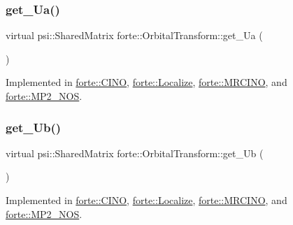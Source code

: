 \mbox{\label{classforte_1_1_orbital_transform_aedd124480b35eba56653109578c05ec9}} 
\subsubsection{\texorpdfstring{get\+\_\+\+Ua()}{get\_Ua()}}
{\footnotesize\ttfamily virtual psi\+::\+Shared\+Matrix forte\+::\+Orbital\+Transform\+::get\+\_\+\+Ua (\begin{DoxyParamCaption}{ }\end{DoxyParamCaption})\hspace{0.3cm}{\ttfamily [pure virtual]}}



Implemented in \mbox{\hyperlink{classforte_1_1_c_i_n_o_a382fe0963a51a908790fda6a7aab0e7c}{forte\+::\+C\+I\+NO}}, \mbox{\hyperlink{classforte_1_1_localize_a9ee389a31b8856a670ff4854906979af}{forte\+::\+Localize}}, \mbox{\hyperlink{classforte_1_1_m_r_c_i_n_o_a75ca07096273157f61dc00db296944ee}{forte\+::\+M\+R\+C\+I\+NO}}, and \mbox{\hyperlink{classforte_1_1_m_p2___n_o_s_a7210e806a978b617b5b848dba3628726}{forte\+::\+M\+P2\+\_\+\+N\+OS}}.

\mbox{\label{classforte_1_1_orbital_transform_aeb179f5b68883cf346dde354c05fd27b}} 
\subsubsection{\texorpdfstring{get\+\_\+\+Ub()}{get\_Ub()}}
{\footnotesize\ttfamily virtual psi\+::\+Shared\+Matrix forte\+::\+Orbital\+Transform\+::get\+\_\+\+Ub (\begin{DoxyParamCaption}{ }\end{DoxyParamCaption})\hspace{0.3cm}{\ttfamily [pure virtual]}}



Implemented in \mbox{\hyperlink{classforte_1_1_c_i_n_o_a24b4455c4b640b7bc01b0f12b0ecb655}{forte\+::\+C\+I\+NO}}, \mbox{\hyperlink{classforte_1_1_localize_add8ecbbd32ef5910a229d6a7225b4be9}{forte\+::\+Localize}}, \mbox{\hyperlink{classforte_1_1_m_r_c_i_n_o_a1a729beebcee99c34d9baa50af547d6e}{forte\+::\+M\+R\+C\+I\+NO}}, and \mbox{\hyperlink{classforte_1_1_m_p2___n_o_s_a2bb9cdbac921a47dd31b6796c8c8daa1}{forte\+::\+M\+P2\+\_\+\+N\+OS}}.



